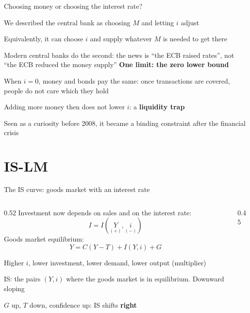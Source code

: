 \documentclass[aspectratio=169,xcolor=table]{beamer}
\begin{document}
\begin{frame}{Choosing money or choosing the interest rate?}
\small
\bi
  \item We described the central bank as choosing $M$ and letting $i$ adjust
  \item Equivalently, it can choose $i$ and supply whatever $M$ is needed to get there
  \item Modern central banks do the second: the news is ``the ECB raised rates'', not ``the ECB reduced the money supply''
\ei
\vspace{0.1cm}
\textbf{One limit: the zero lower bound}
\bi
  \item When $i = 0$, money and bonds pay the same: once transactions are covered, people do not care which they hold
  \item Adding more money then does not lower $i$: a \textbf{liquidity trap}
  \item Seen as a curiosity before 2008, it became a binding constraint after the financial crisis
\ei
{}
\end{frame}

\section{IS-LM}

\begin{frame}{The IS curve: goods market with an interest rate}
\begin{columns}[c]
\begin{column}{0.52\textwidth}
\footnotesize
Investment now depends on sales and on the interest rate:
\[
I = I(\underset{(+)}{Y}, \underset{(-)}{i})
\]
Goods market equilibrium:
\[
Y = C(Y - T) + I(Y, i) + G
\]
\bi
  \item Higher $i$, lower investment, lower demand, lower output (multiplier)
  \item IS: the pairs $(Y, i)$ where the goods market is in equilibrium. Downward sloping
  \item $G$ up, $T$ down, confidence up: IS shifts \textbf{right}
\ei
\end{column}
\begin{column}{0.45\textwidth}
\centering
{}
\end{column}
\end{columns}
\end{frame}
\end{document}
